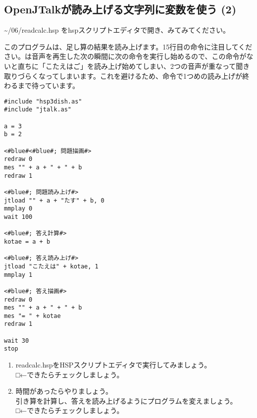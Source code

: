\subsection{OpenJTalkが読み上げる文字列に変数を使う (2)}
 \textasciitilde /06/readcalc.hsp をhspスクリプトエディタで開き、みてみてください。

このプログラムは、足し算の結果を読み上げます。15行目の命令に注目してください。は音声を再生した次の瞬間に次の命令を実行し始めるので、この命令がないと直ちに「こたえはご」を読み上げ始めてしまい、2つの音声が重なって聞き取りづらくなってしまいます。これを避けるため、命令で1つめの読み上げが終わるまで待っています。\\

\begin{lstlisting}[caption=readcalc.hsp,label=readcalc.hsp]
#include "hsp3dish.as"
#include "jtalk.as"

a = 3
b = 2

<#blue#<#blue#; 問題描画#>
redraw 0
mes "" + a + " + " + b
redraw 1

<#blue#; 問題読み上げ#>
jtload "" + a + "たす" + b, 0
mmplay 0
wait 100

<#blue#; 答え計算#>
kotae = a + b

<#blue#; 答え読み上げ#>
jtload "こたえは" + kotae, 1
mmplay 1

<#blue#; 答え描画#>
redraw 0
mes "" + a + " + " + b
mes "= " + kotae
redraw 1

wait 30
stop
\end{lstlisting}

\begin{tcolorbox}[title=\useOmetoi]
\begin{enumerate}
\item readcalc.hspをHSPスクリプトエディタで実行してみましょう。\\□←できたらチェックしましょう。
\item 時間があったらやりましょう。\\引き算を計算し、答えを読み上げるようにプログラムを変えましょう。\\□←できたらチェックしましょう。
\end{enumerate}
\end{tcolorbox}
